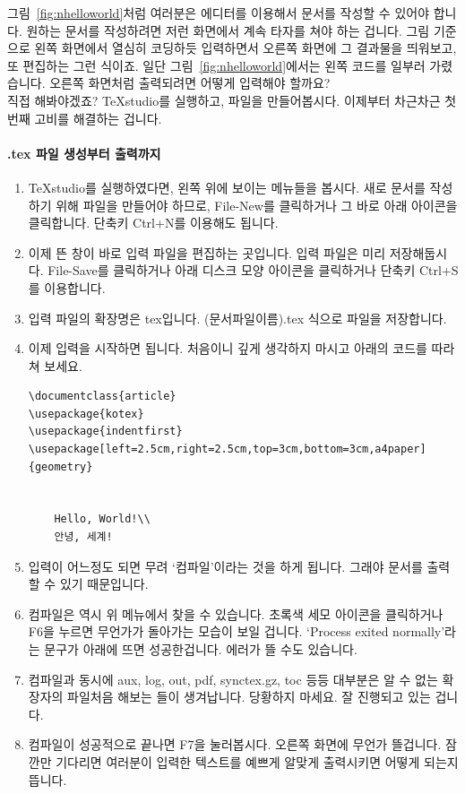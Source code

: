 그림~\ref{fig:nhelloworld}처럼 여러분은 에디터를 이용해서 문서를 작성할 수 있어야 합니다. 원하는 문서를 작성하려면 저런 화면에서 계속 타자를 쳐야 하는 겁니다. 그림 기준으로 왼쪽 화면에서 열심히 코딩하듯 입력하면서 오른쪽 화면에 그 결과물을 띄워보고, 또 편집하는 그런 식이죠. 일단 그림~\ref{fig:nhelloworld}에서는 왼쪽 코드를 일부러 가렸습니다. 오른쪽 화면처럼 출력되려면 어떻게 입력해야 할까요?\\
직접 해봐야겠죠? TeXstudio를 실행하고, 파일을 만들어봅시다. 이제부터 차근차근 첫 번째 고비를 해결하는 겁니다.

\paragraph{.tex 파일 생성부터 출력까지}
\begin{enumerate}
	\item TeXstudio를 실행하였다면, 왼쪽 위에 보이는 메뉴들을 봅시다. 새로 문서를 작성하기 위해 파일을 만들어야 하므로, File-New를 클릭하거나 그 바로 아래 아이콘을 클릭합니다. 단축키 Ctrl+N를 이용해도 됩니다.
	\item 이제 뜬 창이 바로 입력 파일을 편집하는 곳입니다. 입력 파일은 미리 저장해둡시다. File-Save를 클릭하거나 아래 디스크 모양 아이콘을 클릭하거나 단축키 Ctrl+S를 이용합니다. 
	\item 입력 파일의 확장명은 tex입니다. (문서파일이름).tex 식으로 파일을 저장합니다.
	\item 이제 입력을 시작하면 됩니다.
          처음이니 깊게 생각하지 마시고 아래의 코드를 따라 쳐 보세요.
    \begin{Verbatim}[frame=single]
\documentclass{article}
\usepackage{kotex}
\usepackage{indentfirst}
\usepackage[left=2.5cm,right=2.5cm,top=3cm,bottom=3cm,a4paper]{geometry}
	

	Hello, World!\\
	안녕, 세계!

	\end{Verbatim}

	\item 입력이 어느정도 되면 무려 `컴파일'이라는 것을 하게 됩니다. 그래야 문서를 출력할 수 있기 때문입니다.
	\item 컴파일은 역시 위 메뉴에서 찾을 수 있습니다. 초록색 세모 아이콘을 클릭하거나 F6을 누르면 무언가가 돌아가는 모습이 보일 겁니다. `Process exited normally'라는 문구가 아래에 뜨면 성공한겁니다. 에러가 뜰 수도 있습니다.
	\item 컴파일과 동시에 aux, log, out, pdf, synctex.gz, toc 등등 대부분은 알 수 없는 확장자의 파일처음 해보는 들이 생겨납니다. 당황하지 마세요. 잘 진행되고 있는 겁니다.
	\item 컴파일이 성공적으로 끝나면 F7을 눌러봅시다. 오른쪽 화면에 무언가 뜰겁니다. 잠깐만 기다리면 여러분이 입력한 텍스트를 예쁘게 알맞게 출력시키면 어떻게 되는지 뜹니다.
\end{enumerate}

